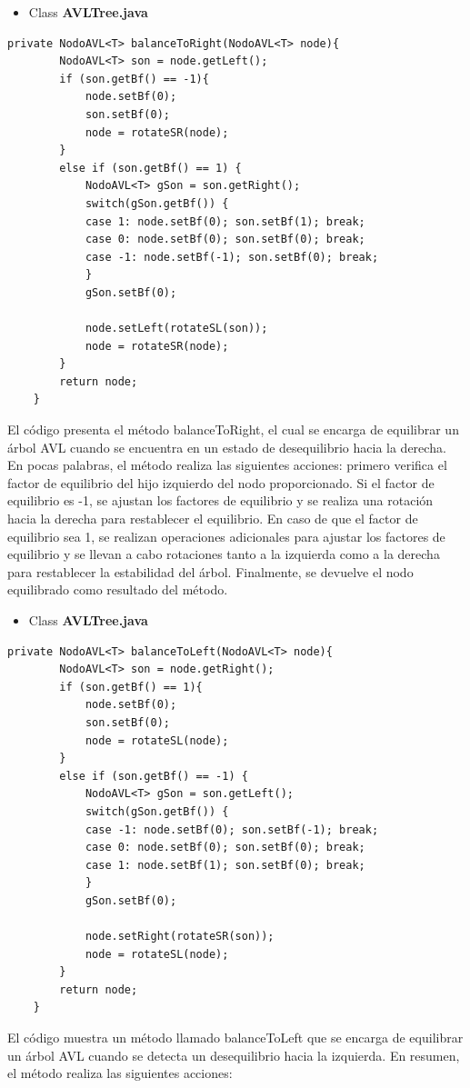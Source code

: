 \documentclass{article}
\begin{document}
\begin{itemize}
        \item Class \textbf{AVLTree.java}
    \end{itemize}
    \begin{lstlisting}[caption={\textbf{Parte 2:}}]
	private NodoAVL<T> balanceToRight(NodoAVL<T> node){
		NodoAVL<T> son = node.getLeft();
		if (son.getBf() == -1){
			node.setBf(0);
			son.setBf(0);
			node = rotateSR(node);
		}
		else if (son.getBf() == 1) {
			NodoAVL<T> gSon = son.getRight();
			switch(gSon.getBf()) {
			case 1: node.setBf(0); son.setBf(1); break;
			case 0: node.setBf(0); son.setBf(0); break;
			case -1: node.setBf(-1); son.setBf(0); break;
			}
			gSon.setBf(0);
			
			node.setLeft(rotateSL(son));
			node = rotateSR(node);
		}
		return node;
	}
         \end{lstlisting}
El código presenta el método balanceToRight, el cual se encarga de equilibrar un árbol AVL cuando se encuentra en un estado de desequilibrio hacia la derecha. En pocas palabras, el método realiza las siguientes acciones: primero verifica el factor de equilibrio del hijo izquierdo del nodo proporcionado. Si el factor de equilibrio es -1, se ajustan los factores de equilibrio y se realiza una rotación hacia la derecha para restablecer el equilibrio. En caso de que el factor de equilibrio sea 1, se realizan operaciones adicionales para ajustar los factores de equilibrio y se llevan a cabo rotaciones tanto a la izquierda como a la derecha para restablecer la estabilidad del árbol. Finalmente, se devuelve el nodo equilibrado como resultado del método.



\begin{itemize}
        \item Class \textbf{AVLTree.java}
    \end{itemize}
    \begin{lstlisting}[caption={\textbf{Parte 2:}}]
	private NodoAVL<T> balanceToLeft(NodoAVL<T> node){
		NodoAVL<T> son = node.getRight();
		if (son.getBf() == 1){
			node.setBf(0);
			son.setBf(0);
			node = rotateSL(node);
		}
		else if (son.getBf() == -1) {
			NodoAVL<T> gSon = son.getLeft();
			switch(gSon.getBf()) {
			case -1: node.setBf(0); son.setBf(-1); break;
			case 0: node.setBf(0); son.setBf(0); break;
			case 1: node.setBf(1); son.setBf(0); break;
			}
			gSon.setBf(0);
			
			node.setRight(rotateSR(son));
			node = rotateSL(node);
		}
		return node;
	}
         \end{lstlisting}
El código muestra un método llamado balanceToLeft que se encarga de equilibrar un árbol AVL cuando se detecta un desequilibrio hacia la izquierda. En resumen, el método realiza las siguientes acciones:
\end{document}
